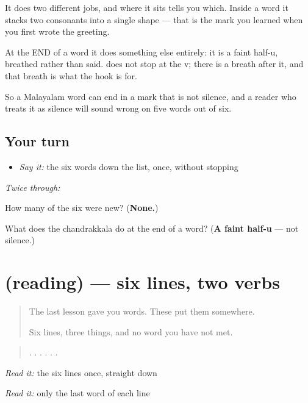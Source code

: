 It does two different jobs, and where it sits tells you which. Inside a word it stacks two consonants into a single shape — that is the mark you learned when you first wrote the greeting.

At the END of a word it does something else entirely: it is a faint half-u, breathed rather than said. \textbf{} does not stop at the v; there is a breath after it, and that breath is what the hook is for.

So a Malayalam word can end in a mark that is not silence, and a reader who treats it as silence will sound wrong on five words out of six.

\subsection*{Your turn}
\begin{itemize}
\raggedright
  \item \emph{Say it:} the six words down the list, once, without stopping
\end{itemize}

\emph{Twice through:}

\begin{tcolorbox}[breakable,colback=teal!4,colframe=teal!35!black,title={Before you move on}]
How many of the six were new? (\textbf{None.})

What does the chandrakkala do at the end of a word? (\textbf{A faint half-u} — not silence.)
\end{tcolorbox}
\section[(reading)]{(reading) — six lines, two verbs}

\label{lesson:ML-C69-lines}



\begin{quote}
The last lesson gave you words. These put them somewhere.

Six lines, three things, and no word you have not met.
\end{quote}

\begin{tcolorbox}[breakable,skin=enhanced,colback=orange!6,colframe=orange!45!black,boxrule=0.5pt,arc=1mm,left=6pt,right=6pt,top=4pt,bottom=4pt,fonttitle=\bfseries,title={Read this}]
\begin{quote}
  .   .   .   .   .   .
\end{quote}

\emph{Read it:} the six lines once, straight down

\emph{Read it:} only the last word of each line
\end{tcolorbox}

